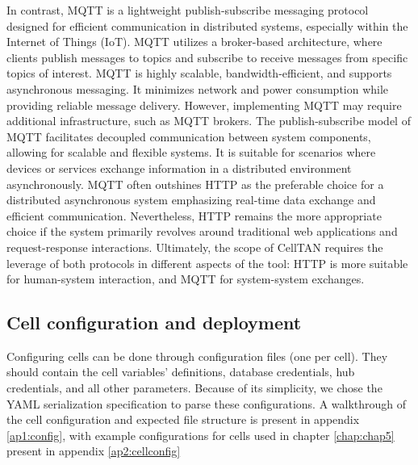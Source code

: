 
In contrast, MQTT is a lightweight publish-subscribe messaging protocol designed for efficient communication in distributed systems, especially within the Internet of Things (IoT). MQTT utilizes a broker-based architecture, where clients publish messages to topics and subscribe to receive messages from specific topics of interest. MQTT is highly scalable, bandwidth-efficient, and supports asynchronous messaging. It minimizes network and power consumption while providing reliable message delivery. However, implementing MQTT may require additional infrastructure, such as MQTT brokers.
The publish-subscribe model of MQTT facilitates decoupled communication between system components, allowing for scalable and flexible systems. It is suitable for scenarios where devices or services exchange information in a distributed environment asynchronously. MQTT often outshines HTTP as the preferable choice for a distributed asynchronous system emphasizing real-time data exchange and efficient communication. Nevertheless, HTTP remains the more appropriate choice if the system primarily revolves around traditional web applications and request-response interactions. Ultimately, the scope of CellTAN requires the leverage of both protocols in different aspects of the tool: HTTP is more suitable for human-system interaction, and MQTT for system-system exchanges.


\subsection{Cell configuration and deployment} \label{subsec:cellconfig}

Configuring cells can be done through configuration files (one per cell). They should contain the cell variables' definitions, database credentials, hub credentials, and all other parameters. Because of its simplicity, we chose the YAML serialization specification \cite{yaml} to parse these configurations. A walkthrough of the cell configuration and expected file structure is present in appendix \ref{ap1:config}, with example configurations for cells used in chapter \ref{chap:chap5} present in appendix \ref{ap2:cellconfig}


